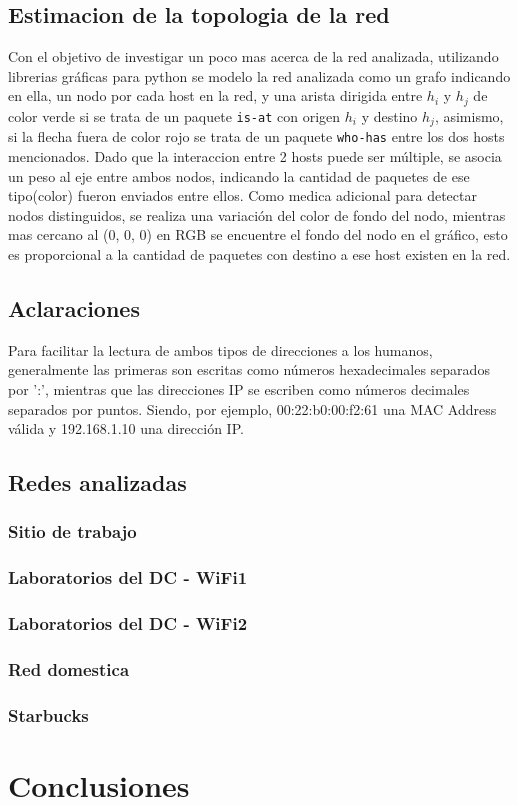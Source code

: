 \subsection{Estimacion de la topologia de la red}
Con el objetivo de investigar un poco mas acerca de la red analizada, utilizando librerias gr\'aficas para python se modelo la red analizada como un grafo indicando en ella, un nodo por cada host en la red, y una arista dirigida entre $h_i$ y $h_j$ de color {\color{green}verde} si se trata de un paquete \texttt{is-at} con origen $h_i$ y destino $h_j$, asimismo, si la flecha fuera de color {\color{red}rojo} se trata de un paquete \texttt{who-has} entre los dos hosts mencionados. Dado que la interaccion entre 2 hosts puede ser m\'ultiple, se asocia un peso al eje entre ambos nodos, indicando la cantidad de paquetes de ese tipo(color) fueron enviados entre ellos. Como medica adicional para detectar nodos distinguidos, se realiza una variaci\'on del color de fondo del nodo, mientras mas cercano al (0, 0, 0) en RGB se encuentre el fondo del nodo en el gr\'afico, esto es proporcional a la cantidad de paquetes con destino a ese host existen en la red.

\subsection{Aclaraciones}
Para facilitar la lectura de ambos tipos de direcciones a los humanos, generalmente las primeras son escritas como números hexadecimales separados por ':', mientras que las direcciones IP se escriben como números decimales separados por puntos. Siendo, por ejemplo, 00:22:b0:00:f2:61 una MAC Address válida y 192.168.1.10 una dirección IP.

\subsection{Redes analizadas}

\subsubsection{Sitio de trabajo}
     
\subsubsection{Laboratorios del DC - WiFi1}%
     
\subsubsection{Laboratorios del DC - WiFi2}%
     
\subsubsection{Red domestica}
     
\subsubsection{Starbucks}
     
\section{Conclusiones}

